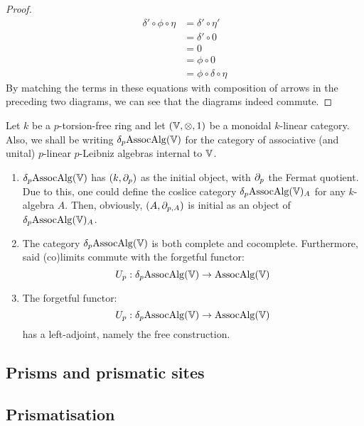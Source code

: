\begin{proof}
                    $$
                        \begin{aligned}
                            \delta' \circ \phi \circ \eta & = \delta' \circ \eta'
                            \\
                            & = \delta' \circ 0
                            \\
                            & = 0
                            \\
                            & = \phi \circ 0
                            \\
                            & = \phi \circ \delta \circ \eta
                        \end{aligned}
                    $$
                By matching the terms in these equations with composition of arrows in the preceding two diagrams, we can see that the diagrams indeed commute.
            \end{proof}
    
        \begin{proposition}
            Let $k$ be a $p$-torsion-free ring and let $(\V, \tensor, 1)$ be a monoidal $k$-linear category. Also, we shall be writing $\delta_p\mathrm{Assoc}\mathrm{Alg}(\mathbb{V})$ for the category of associative (and unital) $p$-linear $p$-Leibniz algebras internal to $\mathbb{V}$. 
                \begin{enumerate}
                    \item $\delta_p\mathrm{Assoc}\mathrm{Alg}(\mathbb{V})$ has $(k, \partial_p)$ as the initial object, with $\partial_p$ the Fermat quotient. Due to this, one could define the coslice category $\delta_p\mathrm{Assoc}\mathrm{Alg}(\mathbb{V})_A$ for any $k$-algebra $A$. Then, obviously, $(A, \partial_{p,A})$ is initial as an object of $\delta_p\mathrm{Assoc}\mathrm{Alg}(\mathbb{V})_A$.
                    \item The category $\delta_p\mathrm{Assoc}\mathrm{Alg}(\mathbb{V})$ is both complete and cocomplete. Furthermore, said (co)limits commute with the forgetful functor:
                        $$U_p: \delta_p\mathrm{Assoc}\mathrm{Alg}(\mathbb{V}) \to \mathrm{Assoc}\mathrm{Alg}(\mathbb{V})$$
                    \item The forgetful functor:
                        $$U_p: \delta_p\mathrm{Assoc}\mathrm{Alg}(\mathbb{V}) \to \mathrm{Assoc}\mathrm{Alg}(\mathbb{V})$$
                    has a left-adjoint, namely the free construction.
                \end{enumerate}
        \end{proposition}
        
    \subsection{Prisms and prismatic sites}
        
    \subsection{Prismatisation}